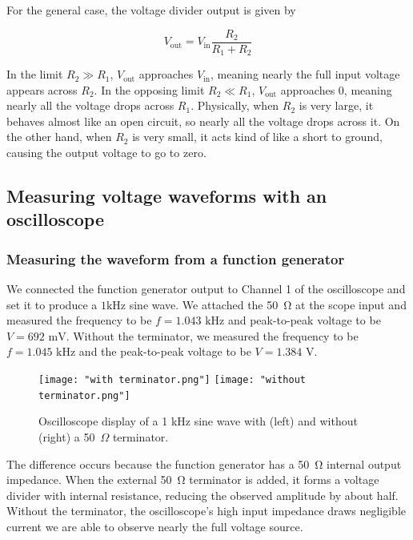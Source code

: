 \documentclass{article}
\begin{document}
For the general case, the voltage divider output is given by

\begin{equation}
    V_\text{out}=V_\text{in}\frac{R_2}{R_1+R_2}
\end{equation}

\noindent In the limit $R_2\gg R_1$, $V_\text{out}$ approaches $V_\text{in}$, meaning nearly the full input voltage appears across $R_2$. In the opposing limit $R_2\ll R_1$, $V_\text{out}$ approaches $0$, meaning nearly all the voltage drops across $R_1$. Physically, when $R_2$ is very large, it behaves almost like an open circuit, so nearly all the voltage drops across it. On the other hand, when $R_2$ is very small, it acts kind of like a short to ground, causing the output voltage to go to zero.

\subsection{Measuring voltage waveforms with an oscilloscope}

\subsubsection{Measuring the waveform from a function generator}

We connected the function generator output to Channel 1 of the oscilloscope and set it to produce a $1\text{kHz}$ sine wave. We attached the \SI{50}{\ohm} at the scope input and measured the frequency to be $f=1.043\text{ kHz}$ and peak-to-peak voltage to be $V=692\text{ mV}$. Without the terminator, we measured the frequency to be $f=1.045\text{ kHz}$ and the peak-to-peak voltage to be $V=1.384\text{ V}$.\\

\begin{figure}[H]
    \centering
    \texttt{[image: "with terminator.png"]}
    \hfill
    \texttt{[image: "without terminator.png"]}
    \caption{Oscilloscope display of a 1 kHz sine wave with (left) and without (right) a 50~$\Omega$ terminator.}
    \label{fig:scope_comparison}
\end{figure}

\noindent The difference occurs because the function generator has a \SI{50}{\ohm} internal output impedance. When the external \SI{50}{\ohm} terminator is added, it forms a voltage divider with internal resistance, reducing the observed amplitude by about half. Without the terminator, the oscilloscope's high input impedance draws negligible current we are able to observe nearly the full voltage source.
\end{document}
